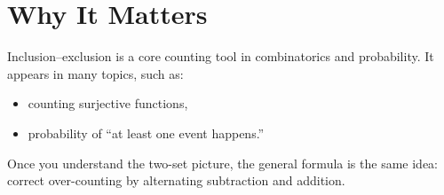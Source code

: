 \section{Why It Matters}
Inclusion--exclusion is a core counting tool in combinatorics and probability.
It appears in many topics, such as:
\begin{itemize}
  \item counting surjective functions,
  \item probability of ``at least one event happens.''
\end{itemize}

Once you understand the two-set picture, the general formula is the same idea:
correct over-counting by alternating subtraction and addition.

